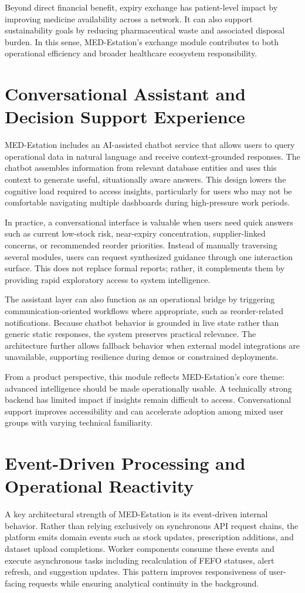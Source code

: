 \documentclass[12pt,a4paper]{report}
\begin{document}
Beyond direct financial benefit, expiry exchange has patient-level impact by improving medicine availability across a network. It can also support sustainability goals by reducing pharmaceutical waste and associated disposal burden. In this sense, MED-Estation’s exchange module contributes to both operational efficiency and broader healthcare ecosystem responsibility.

\chapter{Conversational Assistant and Decision Support Experience}
MED-Estation includes an AI-assisted chatbot service that allows users to query operational data in natural language and receive context-grounded responses. The chatbot assembles information from relevant database entities and uses this context to generate useful, situationally aware answers. This design lowers the cognitive load required to access insights, particularly for users who may not be comfortable navigating multiple dashboards during high-pressure work periods.

In practice, a conversational interface is valuable when users need quick answers such as current low-stock risk, near-expiry concentration, supplier-linked concerns, or recommended reorder priorities. Instead of manually traversing several modules, users can request synthesized guidance through one interaction surface. This does not replace formal reports; rather, it complements them by providing rapid exploratory access to system intelligence.

The assistant layer can also function as an operational bridge by triggering communication-oriented workflows where appropriate, such as reorder-related notifications. Because chatbot behavior is grounded in live state rather than generic static responses, the system preserves practical relevance. The architecture further allows fallback behavior when external model integrations are unavailable, supporting resilience during demos or constrained deployments.

From a product perspective, this module reflects MED-Estation’s core theme: advanced intelligence should be made operationally usable. A technically strong backend has limited impact if insights remain difficult to access. Conversational support improves accessibility and can accelerate adoption among mixed user groups with varying technical familiarity.

\chapter{Event-Driven Processing and Operational Reactivity}
A key architectural strength of MED-Estation is its event-driven internal behavior. Rather than relying exclusively on synchronous API request chains, the platform emits domain events such as stock updates, prescription additions, and dataset upload completions. Worker components consume these events and execute asynchronous tasks including recalculation of FEFO statuses, alert refresh, and suggestion updates. This pattern improves responsiveness of user-facing requests while ensuring analytical continuity in the background.
\end{document}
